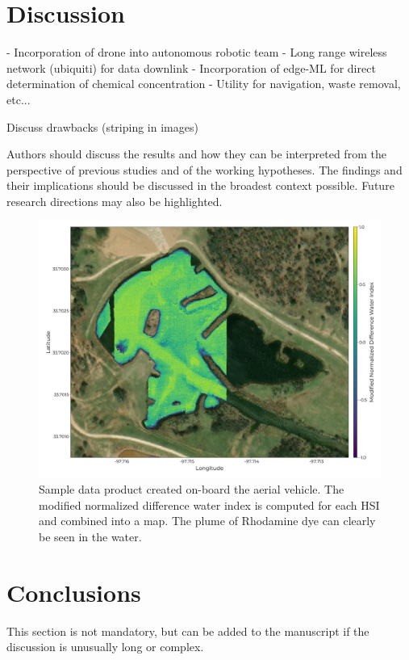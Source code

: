 \documentclass[remotesensing,article,submit,pdftex,moreauthors]{Definitions/mdpi}
\begin{document}
\section{Discussion}

- Incorporation of drone into autonomous robotic team
- Long range wireless network (ubiquiti) for data downlink
- Incorporation of edge-ML for direct determination of chemical concentration
- Utility for navigation, waste removal, etc...

Discuss drawbacks (striping in images) 

Authors should discuss the results and how they can be interpreted from the perspective of previous studies and of the working hypotheses. The findings and their implications should be discussed in the broadest context possible. Future research directions may also be highlighted.

\begin{figure}[H]
    \includegraphics[width=10.5 cm]{./figures/mNDWI_example.png}
\caption{Sample data product created on-board the aerial vehicle. The modified normalized difference water index is computed for each HSI and combined into a map. The plume of Rhodamine dye can clearly be seen in the water.\label{fig-map}}
\end{figure}

\section{Conclusions}

This section is not mandatory, but can be added to the manuscript if the discussion is unusually long or complex.

\end{document}
